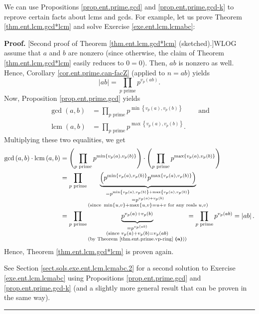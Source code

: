 \documentclass[numbers=enddot,12pt,final,onecolumn,notitlepage]{scrartcl}%
\numberwithin{exer}{subsection}
\theoremstyle{definition}
\newenvironment{fineprint}{\begin{small}}{\end{small}}
\newenvironment{proof}[1][Proof]{\noindent\textbf{#1.} }{\ \rule{0.5em}{0.5em}}
\let\prodnonlimits\prod
\renewcommand{\prod}{\prodnonlimits\limits}
\begin{document}
We can use Propositions \ref{prop.ent.prime.gcd} and
\ref{prop.ent.prime.gcd-k} to reprove certain facts about lcms and gcds. For
example, let us prove Theorem \ref{thm.ent.lcm.gcd*lcm} and solve Exercise
\ref{exe.ent.lcm.lcmabc}:

\begin{fineprint}
\begin{proof}
[Second proof of Theorem \ref{thm.ent.lcm.gcd*lcm} (sketched).]WLOG assume
that $a$ and $b$ are nonzero (since otherwise, the claim of Theorem
\ref{thm.ent.lcm.gcd*lcm} easily reduces to $0=0$). Then, $ab$ is nonzero as
well. Hence, Corollary \ref{cor.ent.prime.can-facZ} (applied to $n=ab$) yields%
\[
\left\vert ab\right\vert =\prod_{p\text{ prime}}p^{v_{p}\left(  ab\right)  }.
\]
Now, Proposition \ref{prop.ent.prime.gcd} yields%
\begin{align*}
\gcd\left(  a,b\right)   &  =\prod_{p\text{ prime}}p^{\min\left\{
v_{p}\left(  a\right)  ,v_{p}\left(  b\right)  \right\}  }%
\ \ \ \ \ \ \ \ \ \ \text{and}\\
\operatorname{lcm}\left(  a,b\right)   &  =\prod_{p\text{ prime}}%
p^{\max\left\{  v_{p}\left(  a\right)  ,v_{p}\left(  b\right)  \right\}  }.
\end{align*}
Multiplying these two equalities, we get%
\begin{align*}
\gcd\left(  a,b\right)  \cdot\operatorname{lcm}\left(  a,b\right)   &
=\left(  \prod_{p\text{ prime}}p^{\min\left\{  v_{p}\left(  a\right)
,v_{p}\left(  b\right)  \right\}  }\right)  \cdot\left(  \prod_{p\text{
prime}}p^{\max\left\{  v_{p}\left(  a\right)  ,v_{p}\left(  b\right)
\right\}  }\right) \\
&  =\prod_{p\text{ prime}}\underbrace{\left(  p^{\min\left\{  v_{p}\left(
a\right)  ,v_{p}\left(  b\right)  \right\}  }p^{\max\left\{  v_{p}\left(
a\right)  ,v_{p}\left(  b\right)  \right\}  }\right)  }_{\substack{=p^{\min
\left\{  v_{p}\left(  a\right)  ,v_{p}\left(  b\right)  \right\}
+\max\left\{  v_{p}\left(  a\right)  ,v_{p}\left(  b\right)  \right\}
}\\=p^{v_{p}\left(  a\right)  +v_{p}\left(  b\right)  }\\\text{(since }%
\min\left\{  u,v\right\}  +\max\left\{  u,v\right\}  =u+v\text{ for any reals
}u,v\text{)}}}\\
&  =\prod_{p\text{ prime}}\underbrace{p^{v_{p}\left(  a\right)  +v_{p}\left(
b\right)  }}_{\substack{=p^{v_{p}\left(  ab\right)  }\\\text{(since }%
v_{p}\left(  a\right)  +v_{p}\left(  b\right)  =v_{p}\left(  ab\right)
\\\text{(by Theorem \ref{thm.ent.prime.vp-ring} \textbf{(a)}))}}%
}=\prod_{p\text{ prime}}p^{v_{p}\left(  ab\right)  }=\left\vert ab\right\vert
.
\end{align*}
Hence, Theorem \ref{thm.ent.lcm.gcd*lcm} is proven again.

See Section \ref{sect.sols.exe.ent.lcm.lcmabc.2} for a second solution to
Exercise \ref{exe.ent.lcm.lcmabc} using Propositions \ref{prop.ent.prime.gcd}
and \ref{prop.ent.prime.gcd-k} (and a slightly more general result that can be
proven in the same way).
\end{proof}
\end{fineprint}
\end{document}
